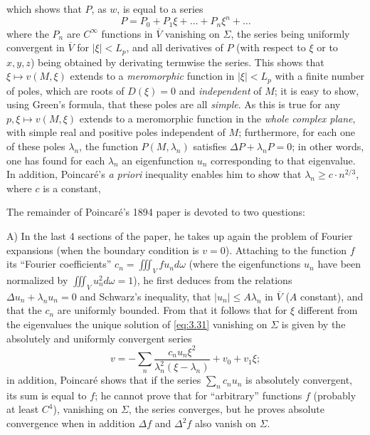 \documentclass[12pt,a4paper,leqno,twoside]{extbook}
\begin{document}
which shows that \(P\), as \(w\), is equal to a series
\begin{equation}
    \label{eq:3.35}
    P = P_0 + P_1 \xi + \ldots + P_n \xi^n + \ldots
\end{equation}
where the \(P_n\) are \(C^\infty\) functions in \(\overline{V}\) vanishing on \(\Sigma\), the series being uniformly convergent in \(\overline{V}\) for \(|\xi| < L_p\), and all derivatives of \(P\) (with respect to \(\xi\) or to \(x,y,z\)) being obtained by derivating termwise the series. This shows that \(\xi \mapsto v(M, \xi)\) extends to a \emph{meromorphic} function in \(|\xi|<L_p\) with a finite number of poles, which are roots of \(D(\xi) = 0\) and \emph{independent} of \(M\); it is easy to show, using Green's formula, that these poles are all \emph{simple}. As this is true for any \(p, \xi \mapsto v(M, \xi)\) extends to a meromorphic function in the \emph{whole complex plane}, with simple real and positive poles independent of \(M\); furthermore, for each one of these poles \(\lambda_n\), the function \(P(M, \lambda_n)\) satisfies \(\Delta P + \lambda_n P = 0\); in other words, one has found for each \(\lambda_n\) an eigenfunction \(u_n\) corresponding to that eigenvalue. In addition, Poincaré's \emph{a priori} inequality enables him to show that \(\lambda_n \geq c \cdot n^{2/3}\), where \(c\) is a constant,

The remainder of Poincaré's 1894 paper is devoted to two questions:

A) In the last 4 sections of the paper, he takes up again the problem of Fourier expansions (when the boundary condition is \(v=0\)). Attaching to the function \(f\) its ``Fourier coefficients'' \(c_n = \iiint_V f u_n d\omega\) (where the eigenfunctions \(u_n\) have been normalized by \(\iiint_V u^2_n d\omega = 1\)), he first deduces from the relations \(\Delta u_n + \lambda_n u_n = 0\) and Schwarz's inequality, that \(|u_n| \leq A \lambda_n\) in \(\overline{V}\) (\(A\) constant), and that the \(c_n\) are uniformly bounded. From that it follows that for \(\xi\) different from the eigenvalues the unique solution of \eqref{eq:3.31} vanishing on \(\Sigma\) is given by the absolutely and uniformly convergent series
\begin{equation}
    \label{eq:3.36}
    v = -\sum_n \frac{c_n u_n \xi^2}{\lambda^2_n \left( \xi - \lambda_n \right)} + v_0 + v_1 \xi;
\end{equation}
in addition, Poincaré shows that if the series \(\sum\limits_n c_n u_n\) is absolutely convergent, its sum is equal to \(f\); he cannot prove that for ``arbitrary'' functions \(f\) (probably at least \(C^4\)), vanishing on \(\Sigma\), the series converges, but he proves absolute convergence when in addition \(\Delta f\) and \(\Delta^2 f\) also vanish on \(\Sigma\).
\end{document}
